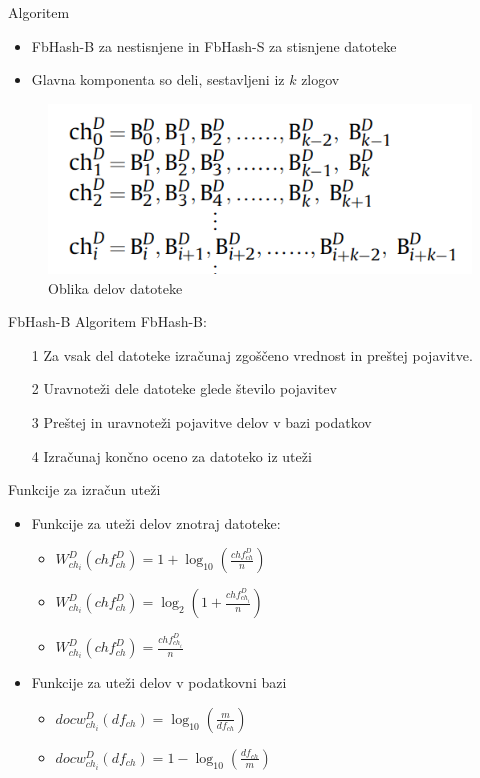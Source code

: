 \documentclass[xcolor=dvipsnames,compress]{beamer}
\begin{document}
\begin{frame}{Algoritem}
\begin{itemize}
    \item FbHash-B za nestisnjene in FbHash-S za stisnjene datoteke
    \item Glavna komponenta so deli, sestavljeni iz $k$ zlogov
\end{itemize}
 \begin{figure}[h]
     \includegraphics[width=0.7\columnwidth]{figs/chunks.png}
	\caption{Oblika delov datoteke}
     \end{figure}
\end{frame}

\begin{frame}{FbHash-B}
Algoritem FbHash-B: 
    \begin{itemize}
    \item[1] Za vsak del datoteke izračunaj zgoščeno vrednost in preštej pojavitve.
    \item[2] Uravnoteži dele datoteke glede število pojavitev
    \item[3] Preštej in uravnoteži pojavitve delov v bazi podatkov
    \item[4] Izračunaj končno oceno za datoteko iz uteži
    \end{itemize}
\end{frame}

\begin{frame}{Funkcije za izračun uteži}
\begin{itemize}
\item Funkcije za uteži delov znotraj datoteke:
    \begin{itemize}
    \item $ W_{ch_i}^{D}(ch f_{ch}^D) = 1 + \log_{10}\left(\frac{ch f_{ch}^D}{n}\right)$
    \item $W_{ch_i}^{D}(ch f_{ch}^D) = \log_2\left(1 + \frac{ch f_{ch_i}^D}{n}\right)$
    \item $W_{ch_i}^{D}(ch f_{ch}^D) = \frac{ch f_{ch_i}^D}{n}$
    \end{itemize}
\item Funkcije za uteži delov v podatkovni bazi
\begin{itemize}
    \item $docw_{ch_i}^{D}(df_{ch}) = \log_{10}\left(\frac{m}{df_{ch}}\right)$
    \item $docw_{ch_i}^{D}(df_{ch}) = 1 - \log_{10}\left(\frac{df_{ch}}{m}\right)$
    \end{itemize}
\end{itemize}
\end{frame}
\end{document}
